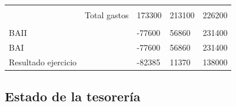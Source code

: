 \documentclass[11pt,leqno]{article}
\begin{document}
\begin{table}[H]
\begin{tabular}{@{}lllll@{}}
                    &                                     &        &        &        \\
                    & Total gastos                        & 173300 & 213100 & 226200 \\
                    &                                     &        &        &        \\
BAII                &                                     & -77600 & 56860  & 231400 \\
BAI                 &                                     & -77600 & 56860  & 231400 \\
Resultado ejercicio &                                     & -82385 & 11370  & 138000 \\ \bottomrule
\end{tabular}
\end{table}


\subsection{Estado de la tesorería}
\end{document}
